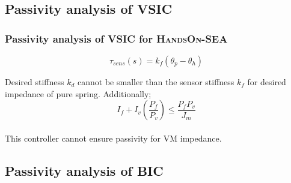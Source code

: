 \documentclass[a4paper,12pt]{article}
\begin{document}
\subsection{Passivity analysis of VSIC}
\subsubsection{Passivity analysis of VSIC for \textsc{HandsOn-SEA}}
\begin{equation}
\tau_{sens}(s)=k_f(\theta_p-\theta_h)
\end{equation}

Desired stiffness $k_d$ cannot be smaller than the sensor stiffness $k_f$\cite{calanca} for desired impedance of pure spring. Additionally;
\begin{equation}
I_f+I_v(\frac{P_f}{P_v})\leq \frac{P_fP_v}{J_m}
\end{equation}\\

This controller cannot ensure passivity for VM impedance\cite{tagliamonte}.
\subsection{Passivity analysis of BIC}
\end{document}
